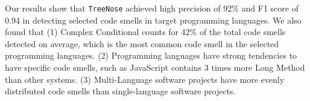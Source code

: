 Our results show that \texttt{TreeNose} achieved high precision of 92\% and F1
score of 0.94 in detecting selected code smells in target programming languages.
We also found that (1) Complex Conditional counts for 42\% of the total code
smells detected on average, which is the most common code smell in the selected
programming languages. (2) Programming languages have strong tendencies to have
specific code smells, such as JavaScript contains 3 times more Long Method than
other systems. (3) Multi-Language software projects have more evenly distributed
code smells than single-language software projects.
